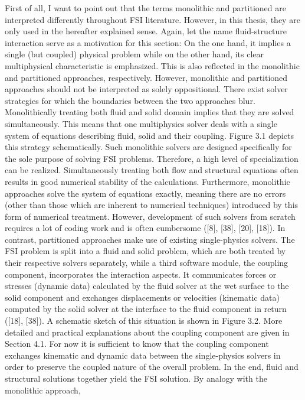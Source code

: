 First of all, I want to point out that the terms monolithic and partitioned are interpreted differently
throughout FSI literature. However, in this thesis, they are only used in the hereafter explained sense.
Again, let the name fluid-structure interaction serve as a motivation for this section: On the one hand,
it implies a single (but coupled) physical problem while on the other hand, its clear multiphysical characteristic
is emphasized. This is also reflected in the monolithic and partitioned approaches, respectively.
However, monolithic and partitioned approaches should not be interpreted as solely oppositional. There
exist solver strategies for which the boundaries between the two approaches blur.
Monolithically treating both fluid and solid domain implies that they are solved simultaneously. This
means that one multiphysics solver deals with a single system of equations describing fluid, solid and their
coupling. Figure 3.1 depicts this strategy schematically. Such monolithic solvers are designed specifically
for the sole purpose of solving FSI problems. Therefore, a high level of specialization can be realized.
Simultaneously treating both flow and structural equations often results in good numerical stability of
the calculations. Furthermore, monolithic approaches solve the system of equations exactly, meaning
there are no errors (other than those which are inherent to numerical techniques) introduced by this form
of numerical treatment. However, development of such solvers from scratch requires a lot of coding work
and is often cumbersome ([8], [38], [20], [18]).
In contrast, partitioned approaches make use of existing single-physics solvers. The FSI problem is split
into a fluid and solid problem, which are both treated by their respective solvers separately, while a third
software module, the coupling component, incorporates the interaction aspects. It communicates forces or stresses (dynamic data) calculated by the fluid solver at the wet surface to the solid component and
exchanges displacements or velocities (kinematic data) computed by the solid solver at the interface to
the fluid component in return ([18], [38]). A schematic sketch of this situation is shown in Figure 3.2.
More detailed and practical explanations about the coupling component are given in Section 4.1. For
now it is sufficient to know that the coupling component exchanges kinematic and dynamic data between
the single-physics solvers in order to preserve the coupled nature of the overall problem. In the end,
fluid and structural solutions together yield the FSI solution. By analogy with the monolithic approach,
